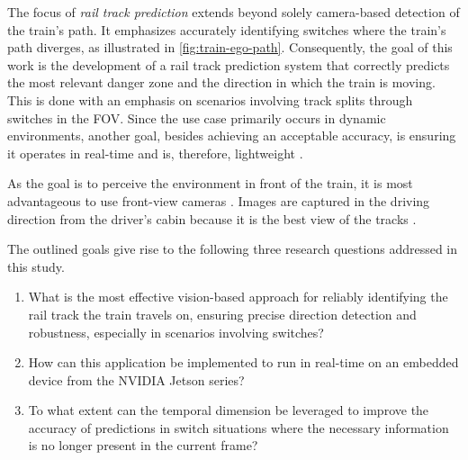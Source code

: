 \noindent The focus of \textit{rail track prediction} extends beyond solely camera-based detection of the train's path.
It emphasizes accurately identifying switches where the train's path diverges, as illustrated in \autoref{fig:train-ego-path}.
Consequently, the goal of this work is the development of a rail track prediction system that correctly predicts the most relevant danger zone and the direction in which the train is moving.
This is done with an emphasis on scenarios involving track splits through switches in the \ac{FOV}.
Since the use case primarily occurs in dynamic environments, another goal, besides achieving an acceptable accuracy, is ensuring it operates in real-time and is, therefore, lightweight \cite{tepNet2024}.

As the goal is to perceive the environment in front of the train, it is most advantageous to use front-view cameras \cite{tepNet2024} \cite{railNet2019}.
Images are captured in the driving direction from the driver's cabin because it is the best view of the tracks \cite{tepNet2024}.

\vspace{1cm} %

The outlined goals give rise to the following three research questions addressed in this study.

\begin{enumerate}
    \item What is the most effective vision-based approach for reliably identifying the rail track the train travels on, ensuring precise direction detection and robustness, especially in scenarios involving switches?
    \item How can this application be implemented to run in real-time on an embedded device from the NVIDIA Jetson series?
    \item To what extent can the temporal dimension be leveraged to improve the accuracy of predictions in switch situations where the necessary information is no longer present in the current frame?
\end{enumerate}

\vspace{2cm} %

